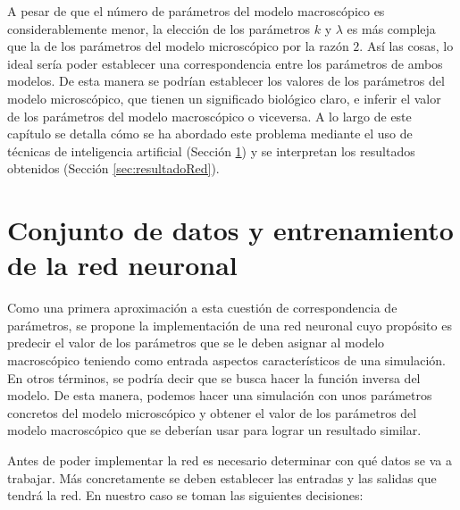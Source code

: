 A pesar de que el número de parámetros del modelo macroscópico es considerablemente menor, la elección de los parámetros $k$ y $\lambda$ es más compleja que la de los parámetros del modelo microscópico por la razón $2$. Así las cosas, lo ideal sería poder establecer una correspondencia entre los parámetros de ambos modelos. De esta manera se podrían establecer los valores de los parámetros del modelo microscópico, que tienen un significado biológico claro, e inferir el valor de los parámetros del modelo macroscópico o viceversa. A lo largo de este capítulo se detalla cómo se ha abordado este problema mediante el uso de técnicas de inteligencia artificial (Sección \ref{sec:conjDatos_entreRed}) y se interpretan los resultados obtenidos (Sección \ref{sec:resultadoRed}). 


\section{Conjunto de datos y entrenamiento de la red neuronal}
\label{sec:conjDatos_entreRed}

Como una primera aproximación a esta cuestión de correspondencia de parámetros, se propone la implementación de una red neuronal cuyo propósito es predecir el valor de los parámetros que se le deben asignar al modelo macroscópico teniendo como entrada aspectos característicos de una simulación. En otros términos, se podría decir que se busca hacer la función inversa del modelo. De esta manera, podemos hacer una simulación con unos parámetros concretos del modelo microscópico y obtener el valor de los parámetros del modelo macroscópico que se deberían usar para lograr un resultado similar. 

Antes de poder implementar la red es necesario determinar con qué datos se va a trabajar. Más concretamente se deben establecer las entradas y las salidas que tendrá la red. En nuestro caso se toman las siguientes decisiones:


